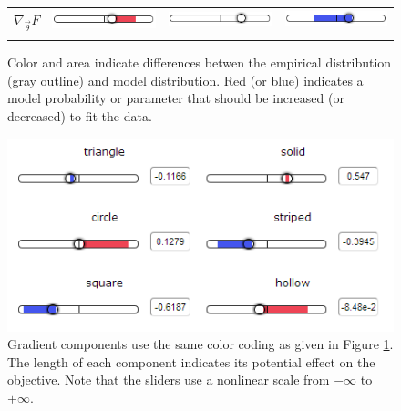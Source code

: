 \documentclass[11pt,letterpaper]{article}
\begin{document}
\begin{figure}[t]
\begin{tabular}{
>{\centering\arraybackslash}m{} 
>{\centering\arraybackslash}m{}
>{\centering\arraybackslash}m{}
>{\centering\arraybackslash}m{}}
$\nabla_{\vec{\theta}} F$ 
& \includegraphics[scale=.25]{images/goldilocks-gradient-small.PNG}
& \includegraphics[scale=.25]{images/goldilocks-gradient-justright.PNG}
& \includegraphics[scale=.25]{images/goldilocks-gradient-large.PNG}\\ \\ 

\end{tabular}
\caption{Color and area indicate differences betwen the empirical
  distribution (gray outline) and model distribution. Red (or blue)
  indicates a model probability or parameter that should be
  increased (or decreased) to fit the data.}
\label{fig:colorsize_inventory}
\end{figure}

\begin{figure}[t]
\centering
\small
\includegraphics[scale=.65]{images/gradient-lesson7.PNG}
\caption{Gradient components use the same color coding as given in
  Figure \ref{fig:colorsize_inventory}. The length of each component
  indicates its potential effect on the objective.  Note that the
  sliders use a nonlinear scale from $-\infty$ to $+\infty$.}
\label{fig:gradients}
\end{figure}
\end{document}
